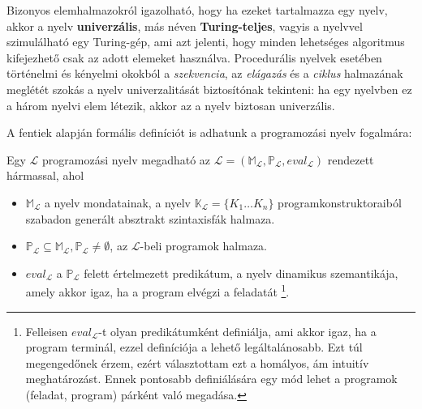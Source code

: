 Bizonyos elemhalmazokról igazolható, hogy ha ezeket tartalmazza egy nyelv, akkor a nyelv \textbf{univerzális}, más néven \textbf{Turing-teljes}, vagyis a nyelvvel szimulálható egy Turing-gép, ami azt jelenti, hogy minden lehetséges algoritmus kifejezhető csak az adott elemeket használva.
Procedurális nyelvek esetében történelmi és kényelmi okokból a \textit{szekvencia}, az \textit{elágazás} és a \textit{ciklus} halmazának meglétét szokás a nyelv univerzalitását biztosítónak tekinteni: ha egy nyelvben ez a három nyelvi elem létezik, akkor az a nyelv biztosan univerzális\cite{Fothi}.

\bigskip

\noindent A fentiek alapján formális definíciót is adhatunk a programozási nyelv fogalmára:
\begin{defn}
	Egy $\mathcal{L}$ programozási nyelv megadható az $\mathcal{L} = (
		\mathbb{M}_\mathcal{L},
		\mathbb{P}_\mathcal{L},
		eval_\mathcal{L}
	)$ rendezett hármassal, ahol
	\begin{itemize}
		\item $\mathbb{M}_\mathcal{L}$ a nyelv mondatainak, a nyelv $\mathbb{K}_\mathcal{L} = \{K_1 \ldots K_n\}$ programkonstruktoraiból szabadon generált absztrakt szintaxisfák halmaza.
		\item $\mathbb{P}_\mathcal{L} \subseteq \mathbb{M}_\mathcal{L}, \mathbb{P}_\mathcal{L} \not= \emptyset$, az $\mathcal{L}$-beli programok halmaza.
		\item $eval_{\mathcal{L}}$ a $\mathbb{P}_\mathcal{L}$ felett értelmezett predikátum, a nyelv dinamikus szemantikája, amely akkor igaz, ha a program elvégzi a feladatát%
		\footnote{
Felleisen $eval_\mathcal{L}$-t olyan predikátumként definiálja, ami akkor igaz, ha a program terminál\cite{Felleisen90}, ezzel  definíciója a lehető legáltalánosabb. Ezt túl megengedőnek érzem, ezért választottam ezt a homályos, ám intuitív meghatározást. Ennek pontosabb definiálására egy mód lehet a programok (feladat, program) párként való megadása.
		}.
	\end{itemize}
\end{defn}

